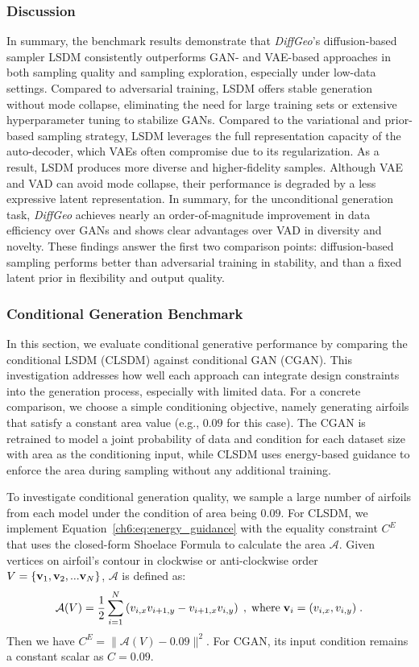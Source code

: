 \subsubsection{Discussion}

In summary, the benchmark results demonstrate that \textit{DiffGeo}’s diffusion-based sampler LSDM consistently outperforms GAN- and VAE-based approaches in both sampling quality and sampling exploration, especially under low-data settings. Compared to adversarial training, LSDM offers stable generation without mode collapse, eliminating the need for large training sets or extensive hyperparameter tuning to stabilize GANs. Compared to the variational and prior-based sampling strategy, LSDM leverages the full representation capacity of the auto-decoder, which VAEs often compromise due to its regularization. As a result, LSDM produces more diverse and higher-fidelity samples. Although VAE and VAD can avoid mode collapse, their performance is degraded by a less expressive latent representation. In summary, for the unconditional generation task, \textit{DiffGeo} achieves nearly an order-of-magnitude improvement in data efficiency over GANs and shows clear advantages over VAD in diversity and novelty. These findings answer the first two comparison points: diffusion-based sampling performs better than adversarial training in stability, and than a fixed latent prior in flexibility and output quality.

\subsubsection{Conditional Generation Benchmark}
In this section,  we evaluate conditional generative performance by comparing the conditional LSDM (CLSDM) against conditional GAN (CGAN). This investigation addresses how well each approach can integrate design constraints into the generation process, especially with limited data. For a concrete comparison, we choose a simple conditioning objective, namely generating airfoils that satisfy a constant area value (e.g., $0.09$ for this case). The CGAN is retrained to model a joint probability of data and condition for each dataset size with area as the conditioning input, while CLSDM uses energy-based guidance to enforce the area during sampling without any additional training. 

To investigate conditional generation quality, we sample a large number of airfoils from each model under the condition of area being $0.09$. For CLSDM, we implement Equation~\ref{ch6:eq:energy_guidance} with the equality constraint $C^E$ that uses the closed-form Shoelace Formula to calculate the area $\mathcal{A}$. Given vertices on airfoil's contour in clockwise or anti-clockwise order $V=\{\mathbf{v}_1, \mathbf{v}_2,...\mathbf{v}_N\}$, $\mathcal{A}$ is defined as:
\begin{equation}
    \mathcal{A}(V) = \frac{1}{2} \sum_{i=1}^N \left(v_{i,x}v_{i+1,y} - v_{i+1,x}v_{i,y} \right)\;,\;\text{where}\;\mathbf{v}_i = (v_{i,x},v_{i,y})\;.
\end{equation}
Then we have $C^E = \bigl\| \mathcal{A}(V)-0.09\bigr\| ^2$. For CGAN, its input condition remains a constant scalar as $C=0.09$.

